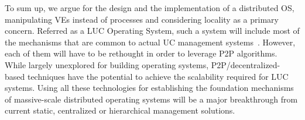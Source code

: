 To sum up,  we argue for the design and the implementation of a distributed OS,
manipulating VEs instead of processes and considering locality as a primary concern. 
Referred as a LUC Operating System, such
a system will include most of the mechanisms that are common to actual UC
management systems~\cite{cloudstack,nimbus,opennebula,openstack,lowe:wiley11,moreno:2012}.  However,
each of them will have to be rethought in order to leverage P2P algorithms.
%
While largely unexplored for building operating systems,
P2P/decentralized-based techniques have the potential to achieve the scalability required
for LUC systems.
Using all these technologies for establishing the foundation mechanisms of
massive-scale distributed operating systems will be a major breakthrough from
current static, centralized or hierarchical management solutions.

%
